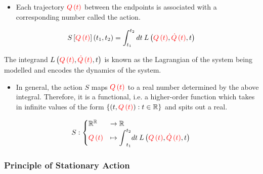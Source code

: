 \documentclass{beamer}
\begin{document}
\begin{frame}
\begin{itemize}
\item Each trajectory $\textcolor{red}{Q \left( t \right)}$ between the endpoints is associated with a corresponding number called the action.
\end{itemize}

$$S \left[ \textcolor{red}{Q \left( t \right)} \right] \left( t_1, t_2 \right) = \int_{t_1}^{t_2} dt \: L \left( \textcolor{red}{Q \left( t \right)}, \textcolor{red}{\dot{Q} \left( t \right)}, t \right)$$

\begin{flushright}
The integrand $L \left( \textcolor{red}{Q \left( t \right)}, \textcolor{red}{\dot{Q} \left( t \right)}, t \right)$ is known as the Lagrangian of the system being modelled and encodes the dynamics of the system.
\end{flushright}

\begin{itemize}
\item In general, the action $S$ maps $\textcolor{red}{Q \left( t \right)}$ to a real number determined by the above integral. Therefore, it is a functional, i.e. a higher-order function which takes in infinite values of the form $\left\{ \left( t, \textcolor{red}{Q \left( t \right)} \right) : t \in \mathbb{R} \right\}$ and spits out a real.
\end{itemize}

$$
S : \begin{cases} \mathbb{R}^\mathbb{R} & \to \mathbb{R} \\ \textcolor{red}{Q \left( t \right)} & \mapsto \displaystyle{\int}_{t_1}^{t_2} dt \: L \left( \textcolor{red}{Q \left( t \right)}, \textcolor{red}{\dot{Q} \left( t \right)}, t \right) \end{cases}
$$
\end{frame}

\begin{frame}
\frametitle{Principle of Stationary Action}
\end{frame}
\end{document}
